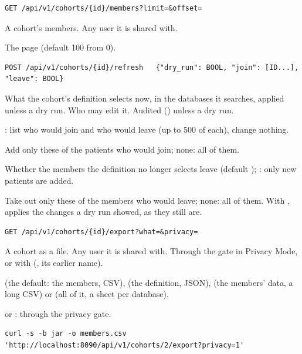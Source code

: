 \begin{lstlisting}[style=signature]
GET /api/v1/cohorts/{id}/members?limit=&offset=
\end{lstlisting}
A cohort's members. Any user it is shared with.
\begin{params}
\item[limit, offset] The page (default 100 from 0).
\end{params}

\begin{lstlisting}[style=signature]
POST /api/v1/cohorts/{id}/refresh   {"dry_run": BOOL, "join": [ID...], "leave": BOOL}
\end{lstlisting}
What the cohort's definition selects now, in the databases it searches, applied unless a dry
run. Who may edit it. Audited
() unless a dry run.
\begin{params}
\item[dry\_run] : list who would join and who would leave (up to 500 of each),
  change nothing.
\item[join] Add only these of the patients who would join; none: all of them.
\item[leave] Whether the members the definition no longer selects leave (default );
  : only new patients are added.
\item[remove] Take out only these of the members who would leave; none: all of them. With
  , applies the changes a dry run showed, as they still are.
\end{params}

\begin{lstlisting}[style=signature]
GET /api/v1/cohorts/{id}/export?what=&privacy=
\end{lstlisting}
A cohort as a file. Any user it is shared with. Through the gate in Privacy Mode, or with
 (, its earlier name).
\begin{params}
\item[what]  (the default: the members, CSV),  (the definition,
  JSON),  (the members' data, a long CSV) or  (all of it, a sheet per
  database).
\item[privacy]  or : through the privacy gate.
\end{params}
\begin{lstlisting}[style=shell]
curl -s -b jar -o members.csv 'http://localhost:8090/api/v1/cohorts/2/export?privacy=1'
\end{lstlisting}


